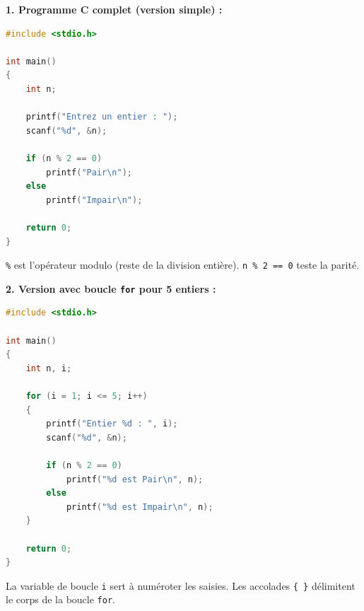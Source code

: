 \documentclass[11pt]{article}
\begin{document}
\begin{corrige}
\textbf{1. Programme C complet (version simple) :}
\begin{lstlisting}[language=C]
#include <stdio.h>

int main()
{
    int n;

    printf("Entrez un entier : ");
    scanf("%d", &n);

    if (n % 2 == 0)
        printf("Pair\n");
    else
        printf("Impair\n");

    return 0;
}
\end{lstlisting}
\texttt{\%} est l'opérateur modulo (reste de la division entière). \texttt{n \% 2 == 0} teste la parité.

\textbf{2. Version avec boucle \texttt{for} pour 5 entiers :}
\begin{lstlisting}[language=C]
#include <stdio.h>

int main()
{
    int n, i;

    for (i = 1; i <= 5; i++)
    {
        printf("Entier %d : ", i);
        scanf("%d", &n);

        if (n % 2 == 0)
            printf("%d est Pair\n", n);
        else
            printf("%d est Impair\n", n);
    }

    return 0;
}
\end{lstlisting}
La variable de boucle \texttt{i} sert à numéroter les saisies. Les accolades \texttt{\{ \}} délimitent le corps de la boucle \texttt{for}.
\end{corrige}
\end{document}
